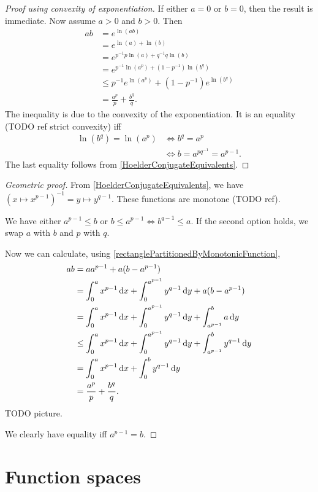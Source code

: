 \begin{proof}[Proof using convexity of exponentiation]
If either $a=0$ or $b =0$, then the result is immediate. Now assume $a>0$ and $b>0$. Then
\begin{align*}
ab &= e^{\ln(ab)} \\
&= e^{\ln(a)+\ln(b)} \\
&= e^{p^{-1}p\ln(a)+q^{-1}q\ln(b)} \\
&= e^{p^{-1}\ln(a^p)+(1-p^{-1})\ln(b^q)} \\
&\leq p^{-1}e^{\ln(a^p)}+(1-p^{-1})e^{\ln(b^q)} \\
&= \frac{a^p}{p} + \frac{b^q}{q}.
\end{align*}
The inequality is due to the convexity of the exponentiation. It is an equality (TODO ref strict convexity) iff
\begin{align*}
\ln(b^q) = \ln(a^p) &\iff b^q = a^p \\
&\iff b = a^{pq^{-1}} = a^{p-1}.
\end{align*}
The last equality follows from \ref{HoelderConjugateEquivalents}.
\end{proof}
\begin{proof}[Geometric proof]
From \ref{HoelderConjugateEquivalents}, we have $(x\mapsto x^{p-1})^{-1} = y\mapsto y^{q-1}$. These functions are monotone (TODO ref).

We have either $a^{p-1}\leq b$ or $b\leq a^{p-1} \iff b^{q-1} \leq a$. If the second option holds, we swap $a$ with $b$ and $p$ with $q$.

Now we can calculate, using \ref{rectanglePartitionedByMonotonicFunction},
\begin{align*}
ab &= aa^{p-1} + a(b-a^{p-1}) \\
&= \int_0^a x^{p-1}\diff{x} + \int_0^{a^{p-1}} y^{q-1}\diff{y} + a(b-a^{p-1}) \\
&= \int_0^a x^{p-1}\diff{x} + \int_0^{a^{p-1}} y^{q-1}\diff{y} + \int_{a^{p-1}}^b a\diff{y} \\
&\leq \int_0^a x^{p-1}\diff{x} + \int_0^{a^{p-1}} y^{q-1}\diff{y} + \int_{a^{p-1}}^b y^{q-1}\diff{y} \\
&= \int_0^a x^{p-1}\diff{x} + \int_0^{b} y^{q-1}\diff{y} \\
&= \frac{a^p}{p} + \frac{b^q}{q}.
\end{align*}
TODO picture.

We clearly have equality iff $a^{p-1} = b$.
\end{proof}


\chapter{Function spaces}
